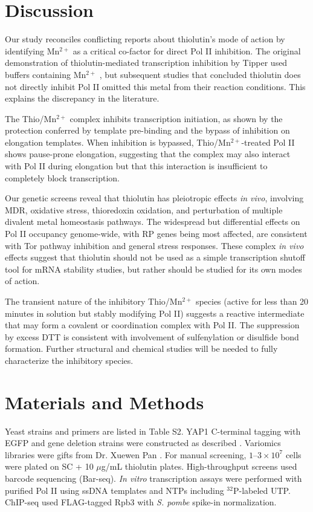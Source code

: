 \documentclass[11pt]{article}
\begin{document}
\section{Discussion}

Our study reconciles conflicting reports about thiolutin's mode of action by identifying Mn$^{2+}$ as a critical co-factor for direct Pol II inhibition. The original demonstration of thiolutin-mediated transcription inhibition by Tipper used buffers containing Mn$^{2+}$ \citep{Tipper1973}, but subsequent studies that concluded thiolutin does not directly inhibit Pol II omitted this metal from their reaction conditions. This explains the discrepancy in the literature.

The Thio/Mn$^{2+}$ complex inhibits transcription initiation, as shown by the protection conferred by template pre-binding and the bypass of inhibition on elongation templates. When inhibition is bypassed, Thio/Mn$^{2+}$-treated Pol II shows pause-prone elongation, suggesting that the complex may also interact with Pol II during elongation but that this interaction is insufficient to completely block transcription.

Our genetic screens reveal that thiolutin has pleiotropic effects \textit{in vivo}, involving MDR, oxidative stress, thioredoxin oxidation, and perturbation of multiple divalent metal homeostasis pathways. The widespread but differential effects on Pol II occupancy genome-wide, with RP genes being most affected, are consistent with Tor pathway inhibition and general stress responses. These complex \textit{in vivo} effects suggest that thiolutin should not be used as a simple transcription shutoff tool for mRNA stability studies, but rather should be studied for its own modes of action.

The transient nature of the inhibitory Thio/Mn$^{2+}$ species (active for less than 20 minutes in solution but stably modifying Pol II) suggests a reactive intermediate that may form a covalent or coordination complex with Pol II. The suppression by excess DTT is consistent with involvement of sulfenylation or disulfide bond formation. Further structural and chemical studies will be needed to fully characterize the inhibitory species.

\section{Materials and Methods}

Yeast strains and primers are listed in Table S2. YAP1 C-terminal tagging with EGFP and gene deletion strains were constructed as described \citep{Longtine1998,Guldener1996}. Variomics libraries were gifts from Dr. Xuewen Pan \citep{Pan2004}. For manual screening, $1$--$3 \times 10^7$ cells were plated on SC + 10 $\mu$g/mL thiolutin plates. High-throughput screens used barcode sequencing (Bar-seq). \textit{In vitro} transcription assays were performed with purified Pol II using ssDNA templates and NTPs including $^{32}$P-labeled UTP. ChIP-seq used FLAG-tagged Rpb3 with \textit{S. pombe} spike-in normalization.


\end{document}

